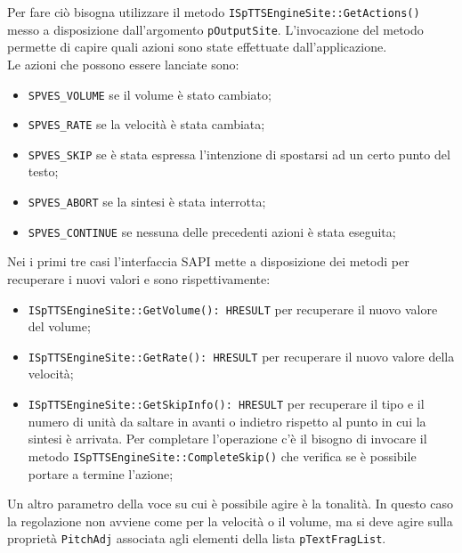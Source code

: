 Per fare ciò bisogna utilizzare il metodo \texttt{ISpTTSEngineSite::GetActions()} messo a disposizione dall'argomento \texttt{pOutputSite}.
L'invocazione del metodo permette di capire quali azioni sono state effettuate dall'applicazione.\\
Le azioni che possono essere lanciate sono:
\begin{itemize}
	\item \texttt{SPVES\_VOLUME} se il volume è stato cambiato;
	\item \texttt{SPVES\_RATE} se la velocità è stata cambiata;
	\item \texttt{SPVES\_SKIP} se è stata espressa l'intenzione di spostarsi ad un certo punto del testo;
	\item \texttt{SPVES\_ABORT} se la sintesi è stata interrotta;
	\item \texttt{SPVES\_CONTINUE} se nessuna delle precedenti azioni è stata eseguita;
\end{itemize}
Nei i primi tre casi l'interfaccia SAPI mette a disposizione dei metodi per recuperare i nuovi valori e sono rispettivamente:
\begin{itemize}
	\item \texttt{ISpTTSEngineSite::GetVolume(): HRESULT} per recuperare il nuovo valore del volume;
	\item \texttt{ISpTTSEngineSite::GetRate(): HRESULT} per recuperare il nuovo valore della velocità;
	\item \texttt{ISpTTSEngineSite::GetSkipInfo(): HRESULT} per recuperare il tipo e il numero di unità da saltare in avanti o indietro rispetto al punto in cui la sintesi è arrivata. Per completare l'operazione c'è il bisogno di invocare il metodo \texttt{ISpTTSEngineSite::CompleteSkip()} che verifica se è possibile portare a termine l'azione;
\end{itemize}	
Un altro parametro della voce su cui è possibile agire è la tonalità. In questo caso la regolazione non avviene come per la velocità o il volume, ma si deve agire sulla proprietà \texttt{PitchAdj} associata agli elementi della lista \texttt{pTextFragList}.

\newpage
